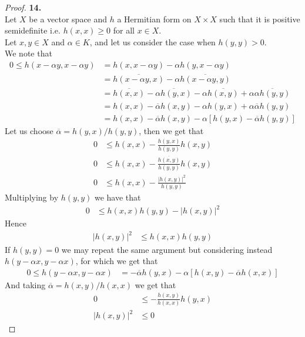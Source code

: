 \documentclass[11pt]{article}
\theoremstyle{definition}
\begin{document}
\cleardoublepage
\begin{proof}{\textbf{14.}}\\
Let $X$ be a vector space and $h$ a Hermitian form on $X \times X$ such that
it is positive semidefinite i.e. $h(x,x) \geq 0$ for all $x \in X$. \\
Let $x,y \in X$ and $\alpha \in K$, and let us consider the case when
$h(y,y) > 0$. \\
We note that
\begin{align*}
    0 \leq h(x - \alpha y, x - \alpha y)
    &= h(x, x - \alpha y) - \alpha h(y, x - \alpha y) \\
    &= \overline{h(x - \alpha y, x)} - \alpha \overline{h(x - \alpha y, y)} \\
    &= \overline{h(x, x)} - \overline{\alpha h(y, x)}
    - \alpha \overline{h(x, y)} + \alpha\overline{\alpha h(y, y)} \\
    &= h(x, x) - \overline{\alpha} h(x,y)
    - \alpha h(y, x) + \alpha\overline{\alpha}h(y, y) \\
    &= h(x, x) - \overline{\alpha} h(x,y)
    - \alpha [h(y, x) - \overline{\alpha}h(y, y)]
\end{align*}
Let us choose $\overline{\alpha} = h(y,x)/h(y,y)$, then we get that
\begin{align*}
    0 &\leq h(x, x) - \frac{h(y,x)}{h(y,y)}h(x,y) \\
    0 &\leq h(x, x) - \frac{\overline{h(x,y)}}{h(y,y)}h(x,y) \\
    0 &\leq h(x, x) - \frac{|h(x,y)|^2}{h(y,y)}
\end{align*}
Multiplying by $h(y,y)$ we have that
\begin{align*}
    0 &\leq h(x, x)h(y, y) - |h(x,y)|^2
\end{align*}
Hence
\begin{align*}
    |h(x,y)|^2 &\leq h(x, x)h(y, y)
\end{align*}
If $h(y,y) = 0$ we may repeat the same argument but considering instead
$h(y - \alpha x, y - \alpha x)$, for which we get that
\begin{align*}
    0 \leq h(y - \alpha x, y - \alpha x)
    &= - \overline{\alpha} h(y,x)
    - \alpha [h(x, y) - \overline{\alpha}h(x, x)]
\end{align*}
And taking $\overline{\alpha} = h(x,y)/h(x,x)$ we get  that
\begin{align*}
    0 &\leq -\frac{h(x,y)}{h(x,x)} h(y,x) \\
    |h(x,y)|^2 &\leq 0
\end{align*}

\end{proof}
\end{document}
